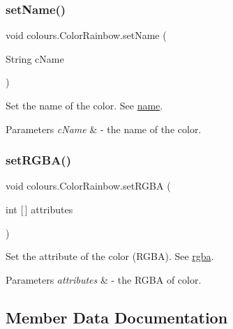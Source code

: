 \subsubsection{\texorpdfstring{set\+Name()}{setName()}}
{\footnotesize\ttfamily void colours.\+Color\+Rainbow.\+set\+Name (\begin{DoxyParamCaption}\item[{String}]{c\+Name }\end{DoxyParamCaption})\hspace{0.3cm}{\ttfamily [inline]}}

Set the name of the color. See \hyperlink{classcolours_1_1_color_rainbow_a829067e626095a0cb25ef7f708ddccb3}{name}. 
\begin{DoxyParams}{Parameters}
{\em c\+Name} & -\/ the name of the color. \\
\hline
\end{DoxyParams}
\mbox{\label{classcolours_1_1_color_rainbow_a68e01c5237778bf54cba5990def3851a}} 
\subsubsection{\texorpdfstring{set\+R\+G\+B\+A()}{setRGBA()}}
{\footnotesize\ttfamily void colours.\+Color\+Rainbow.\+set\+R\+G\+BA (\begin{DoxyParamCaption}\item[{int \mbox{[}$\,$\mbox{]}}]{attributes }\end{DoxyParamCaption})\hspace{0.3cm}{\ttfamily [inline]}}

Set the attribute of the color (R\+G\+BA). See \hyperlink{classcolours_1_1_color_rainbow_aea1f40a66bcc34656e109edcc9cf86dd}{rgba}. 
\begin{DoxyParams}{Parameters}
{\em attributes} & -\/ the R\+G\+BA of color. \\
\hline
\end{DoxyParams}


\subsection{Member Data Documentation}
\mbox{\label{classcolours_1_1_color_rainbow_ae74af795ded4a45f8bffdc26f971903a}} 
